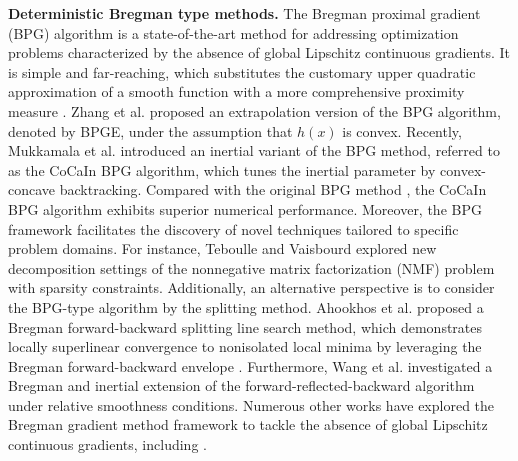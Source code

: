 \documentclass[letterpaper]{article} %
\begin{document}
	\textbf{Deterministic Bregman type methods.} The Bregman proximal gradient (BPG) algorithm \cite{BolteSTV18First} is a state-of-the-art method for addressing optimization problems characterized by the absence of global  Lipschitz continuous gradients. It is simple and far-reaching,
	which substitutes the customary upper quadratic approximation of a smooth function with a more comprehensive proximity measure \cite{BauschkeBT17}.  Zhang et al. \cite{ZhangBM0C19} proposed an extrapolation version of the BPG algorithm, denoted by BPGE, under the assumption that  $h(x)$ is convex. Recently, Mukkamala et al. \cite{MukkamalaOPS20} introduced an inertial variant of the BPG method, referred to as the CoCaIn BPG algorithm, which tunes the inertial parameter by convex-concave backtracking.
	Compared with the original BPG method \cite{BolteSTV18First}, the CoCaIn BPG algorithm exhibits superior numerical performance.
	Moreover, the BPG framework facilitates the discovery of novel techniques tailored to specific problem domains. For instance,  Teboulle and Vaisbourd \cite{TeboulleV20} explored new decomposition settings of the nonnegative matrix factorization (NMF) problem with sparsity constraints. Additionally, an alternative perspective is to consider the BPG-type algorithm by the splitting method. Ahookhos et al. \cite{AhookhoshTP21} proposed a Bregman forward-backward splitting line search method, which demonstrates locally superlinear convergence to nonisolated local minima by leveraging the Bregman forward-backward envelope \cite{BauschkeDL18, LaudeOC20}. Furthermore, Wang et al. \cite{WangTOW22} investigated a Bregman and inertial extension of the forward-reflected-backward algorithm \cite{MalitskyT20} under relative smoothness conditions. %
	Numerous other works have explored the Bregman gradient method framework to tackle the absence of global  Lipschitz continuous gradients, including  \cite{ReemRP19, ZhaoDRW22, ZhuDLZ21, DragomirTdB22}.
\end{document}
